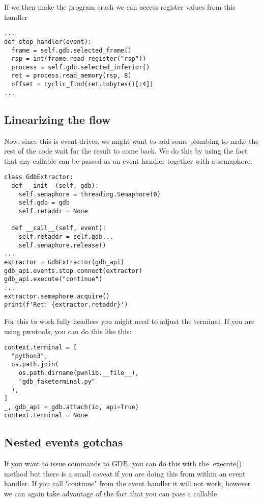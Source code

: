 \documentclass[twocolumn]{article}
\begin{document}
If we then make the program crash we can access register values from this handler

\begin{verbatim}
...
def stop_handler(event):
  frame = self.gdb.selected_frame()
  rsp = int(frame.read_register("rsp"))
  process = self.gdb.selected_inferior()
  ret = process.read_memory(rsp, 8)
  offset = cyclic_find(ret.tobytes()[:4])
...
\end{verbatim}

\vspace*{-0.5\baselineskip}
\subsection*{Linearizing the flow}

Now, since this is event-driven we might want to add some plumbing to make the rest of the code wait for the result to come back. We do this by using the fact that any callable can be passed as an event handler together with a semaphore.

\begin{verbatim}
class GdbExtractor:
  def __init__(self, gdb):
    self.semaphore = threading.Semaphore(0)
    self.gdb = gdb
    self.retaddr = None

  def __call__(self, event):
    self.retaddr = self.gdb...
    self.semaphore.release()
...
extractor = GdbExtractor(gdb_api)
gdb_api.events.stop.connect(extractor)
gdb_api.execute("continue")
...
extractor.semaphore.acquire()
print(f'Ret: {extractor.retaddr}')
\end{verbatim}

For this to work fully headless you might need to adjust the terminal. If you are using pwntools, you can do this like this:

\begin{verbatim}
context.terminal = [
  "python3",
  os.path.join(
    os.path.dirname(pwnlib.__file__),
    "gdb_faketerminal.py"
  ),
]
_, gdb_api = gdb.attach(io, api=True)
context.terminal = None
\end{verbatim}

\vspace*{-0.5\baselineskip}
\subsection*{Nested events gotchas}

If you want to issue commands to GDB, you can do this with the .execute() method but there is a small caveat if you are doing this from within an event handler. If you call "continue" from the event handler it will not work, however we can again take advantage of the fact that you can pass a callable
\end{document}
